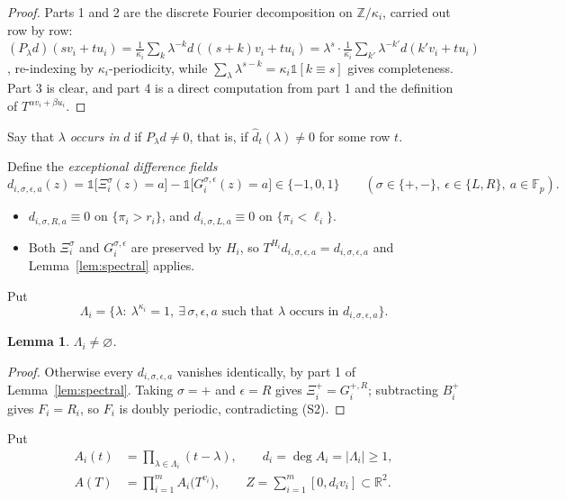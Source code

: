 \documentclass[11pt,reqno]{amsart}
\theoremstyle{plain}
\newtheorem{lem}[thm]{Lemma}
\theoremstyle{definition}
\theoremstyle{remark}
\theoremstyle{plain}
\theoremstyle{remark}
\theoremstyle{definition}
\numberwithin{equation}{section}
\newcommand{\R}{\mathbb{R}}
\newcommand{\Z}{\mathbb{Z}}
\newcommand{\Fp}{\mathbb{F}_p}
\newcommand{\one}{\mathbb{1}}
\begin{document}
\begin{proof}
Parts 1 and 2 are the discrete Fourier decomposition on $\Z/\kappa_i$, carried
out row by row:
$(P_\lambda d)(sv_i+tu_i)=\frac1{\kappa_i}\sum_k\lambda^{-k}
 d((s+k)v_i+tu_i)=\lambda^s\cdot\frac1{\kappa_i}\sum_{k'}\lambda^{-k'}
 d(k'v_i+tu_i)$, re-indexing by $\kappa_i$-periodicity, while
$\sum_\lambda\lambda^{s-k}=\kappa_i\one[k\equiv s]$ gives completeness.  Part 3
is clear, and part 4 is a direct computation from part 1 and the definition of
$T^{\alpha v_i+\beta u_i}$.
\end{proof}

Say that $\lambda$ \emph{occurs in} $d$ if $P_\lambda d\ne0$, that is, if
$\widehat d_t(\lambda)\ne0$ for some row $t$.

Define the \emph{exceptional difference fields}
\[d_{i,\sigma,\epsilon,a}(z)=\one\bigl[\Xi_i^\sigma(z)=a\bigr]
  -\one\bigl[G_i^{\sigma,\epsilon}(z)=a\bigr]\in\{-1,0,1\}
  \qquad(\sigma\in\{+,-\},\ \epsilon\in\{L,R\},\ a\in\Fp).\]

\begin{itemize}
\item[\textup{(P1)}] $d_{i,\sigma,R,a}\equiv0$ on $\{\pi_i>r_i\}$, and
      $d_{i,\sigma,L,a}\equiv0$ on $\{\pi_i<\ell_i\}$.
\item[\textup{(P2)}] Both $\Xi_i^\sigma$ and $G_i^{\sigma,\epsilon}$ are
      preserved by $H_i$, so $T^{H_i}d_{i,\sigma,\epsilon,a}
      =d_{i,\sigma,\epsilon,a}$ and Lemma~\ref{lem:spectral} applies.
\end{itemize}

Put
\[\Lambda_i=\bigl\{\lambda:\ \lambda^{\kappa_i}=1,\ \exists\,\sigma,\epsilon,a
  \text{ such that }\lambda\text{ occurs in }d_{i,\sigma,\epsilon,a}\bigr\}.\]

\begin{lem}\label{lem:Lambda-nonempty}
$\Lambda_i\ne\varnothing$.
\end{lem}

\begin{proof}
Otherwise every $d_{i,\sigma,\epsilon,a}$ vanishes identically, by part 1 of
Lemma~\ref{lem:spectral}.  Taking $\sigma=+$ and $\epsilon=R$ gives
$\Xi_i^+=G_i^{+,R}$; subtracting $B_i^+$ gives $F_i=R_i$, so $F_i$ is doubly
periodic, contradicting \textup{(S2)}.
\end{proof}

Put
\begin{align}
A_i(t)&=\prod_{\lambda\in\Lambda_i}(t-\lambda),\qquad
  d_i=\deg A_i=|\Lambda_i|\ge1, \label{eq:Ai}\\
A(T)&=\prod_{i=1}^mA_i\bigl(T^{v_i}\bigr),\qquad
  Z=\sum_{i=1}^m[0,d_iv_i]\subset\R^2 . \label{eq:AZ}
\end{align}
\end{document}
